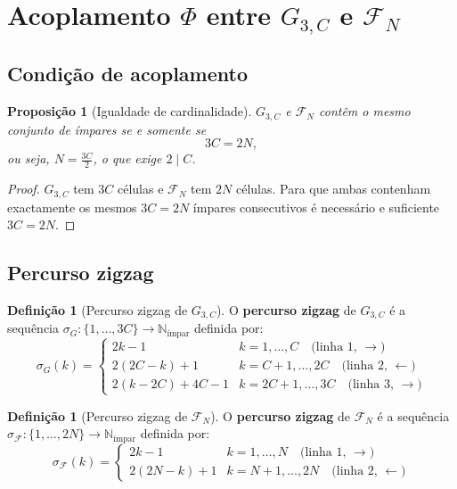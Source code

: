 \documentclass[12pt, a4paper]{article}
\theoremstyle{plain}
\newtheorem{proposition}[theorem]{Proposição}
\theoremstyle{definition}
\newtheorem{definition}[theorem]{Definição}
\theoremstyle{remark}
\begin{document}
	\section{Acoplamento $\Phi$ entre $G_{3,C}$ e $\mathcal{F}_N$}
	\label{sec:phi}
	
	\subsection{Condição de acoplamento}
	
	\begin{proposition}[Igualdade de cardinalidade]
		\label{prop:card}
		$G_{3,C}$ e $\mathcal{F}_N$ contêm o mesmo conjunto de ímpares
		se e somente se
		\[
		3C = 2N,
		\]
		ou seja, $N=\frac{3C}{2}$, o que exige $2\mid C$.
	\end{proposition}
	
	\begin{proof}
		$G_{3,C}$ tem $3C$ células e $\mathcal{F}_N$ tem $2N$ células.
		Para que ambas contenham exactamente os mesmos $3C=2N$ ímpares
		consecutivos é necessário e suficiente $3C=2N$.
	\end{proof}
	
	\subsection{Percurso zigzag}
	
	\begin{definition}[Percurso zigzag de $G_{3,C}$]
		\label{def:zigzag-grade}
		O \textbf{percurso zigzag} de $G_{3,C}$ é a sequência
		$\sigma_G:\{1,\ldots,3C\}\to\mathbb{N}_{\text{ímpar}}$ definida
		por:
		\[
		\sigma_G(k) = \begin{cases}
			2k-1
			& k=1,\ldots,C
			\quad\text{(linha~1, }\rightarrow\text{)}\\[4pt]
			2(2C-k)+1
			& k=C+1,\ldots,2C
			\quad\text{(linha~2, }\leftarrow\text{)}\\[4pt]
			2(k-2C)+4C-1
			& k=2C+1,\ldots,3C
			\quad\text{(linha~3, }\rightarrow\text{)}
		\end{cases}
		\]
	\end{definition}
	
	\begin{definition}[Percurso zigzag de $\mathcal{F}_N$]
		\label{def:zigzag-fita}
		O \textbf{percurso zigzag} de $\mathcal{F}_N$ é a sequência
		$\sigma_{\mathcal{F}}:\{1,\ldots,2N\}\to\mathbb{N}_{\text{ímpar}}$
		definida por:
		\[
		\sigma_{\mathcal{F}}(k) = \begin{cases}
			2k-1
			& k=1,\ldots,N
			\quad\text{(linha~1, }\rightarrow\text{)}\\[4pt]
			2(2N-k)+1
			& k=N+1,\ldots,2N
			\quad\text{(linha~2, }\leftarrow\text{)}
		\end{cases}
		\]
	\end{definition}
	
\end{document}

